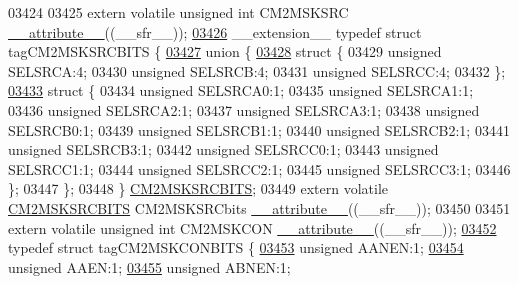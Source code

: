 \begin{DoxyCode}
03424 
03425 \textcolor{keyword}{extern} \textcolor{keyword}{volatile} \textcolor{keywordtype}{unsigned} \textcolor{keywordtype}{int}  CM2MSKSRC \hyperlink{a00015_a493c46f03454991ccc5aa7a6e1dfb2a7}{\_\_attribute\_\_}((\_\_sfr\_\_));
\hypertarget{a00015_source_l03426}{}\hyperlink{a00014}{03426} \_\_extension\_\_ \textcolor{keyword}{typedef} \textcolor{keyword}{struct }tagCM2MSKSRCBITS \{
\hypertarget{a00015_source_l03427}{}\hyperlink{a00015}{03427}   \textcolor{keyword}{union }\{
\hypertarget{a00015_source_l03428}{}\hyperlink{a00015}{03428}     \textcolor{keyword}{struct }\{
03429       \textcolor{keywordtype}{unsigned} SELSRCA:4;
03430       \textcolor{keywordtype}{unsigned} SELSRCB:4;
03431       \textcolor{keywordtype}{unsigned} SELSRCC:4;
03432     \};
\hypertarget{a00015_source_l03433}{}\hyperlink{a00015}{03433}     \textcolor{keyword}{struct }\{
03434       \textcolor{keywordtype}{unsigned} SELSRCA0:1;
03435       \textcolor{keywordtype}{unsigned} SELSRCA1:1;
03436       \textcolor{keywordtype}{unsigned} SELSRCA2:1;
03437       \textcolor{keywordtype}{unsigned} SELSRCA3:1;
03438       \textcolor{keywordtype}{unsigned} SELSRCB0:1;
03439       \textcolor{keywordtype}{unsigned} SELSRCB1:1;
03440       \textcolor{keywordtype}{unsigned} SELSRCB2:1;
03441       \textcolor{keywordtype}{unsigned} SELSRCB3:1;
03442       \textcolor{keywordtype}{unsigned} SELSRCC0:1;
03443       \textcolor{keywordtype}{unsigned} SELSRCC1:1;
03444       \textcolor{keywordtype}{unsigned} SELSRCC2:1;
03445       \textcolor{keywordtype}{unsigned} SELSRCC3:1;
03446     \};
03447   \};
03448 \} \hyperlink{a00014_de/de9/a00322}{CM2MSKSRCBITS};
03449 \textcolor{keyword}{extern} \textcolor{keyword}{volatile} \hyperlink{a00014_de/de9/a00322}{CM2MSKSRCBITS} CM2MSKSRCbits \hyperlink{a00015_a493c46f03454991ccc5aa7a6e1dfb2a7}{\_\_attribute\_\_}((\_\_sfr\_\_));
03450 
03451 \textcolor{keyword}{extern} \textcolor{keyword}{volatile} \textcolor{keywordtype}{unsigned} \textcolor{keywordtype}{int}  CM2MSKCON \hyperlink{a00015_a493c46f03454991ccc5aa7a6e1dfb2a7}{\_\_attribute\_\_}((\_\_sfr\_\_));
\hypertarget{a00015_source_l03452}{}\hyperlink{a00014}{03452} \textcolor{keyword}{typedef} \textcolor{keyword}{struct }tagCM2MSKCONBITS \{
\hypertarget{a00015_source_l03453}{}\hyperlink{a00014_a6ea89b9cbdf0bbde3ec8147513e70fa0}{03453}   \textcolor{keywordtype}{unsigned} AANEN:1;
\hypertarget{a00015_source_l03454}{}\hyperlink{a00014_a58bba29325ff11212a73bae4b2b1a707}{03454}   \textcolor{keywordtype}{unsigned} AAEN:1;
\hypertarget{a00015_source_l03455}{}\hyperlink{a00014_a1b2c756ac7255e490499f85cb2d746f3}{03455}   \textcolor{keywordtype}{unsigned} ABNEN:1;

\end{DoxyCode}
